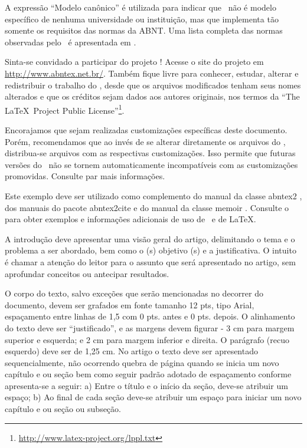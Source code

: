 \documentclass[
article,			%
11pt,				%
twoside,			%
a4paper,			%
section=TITLE,		%
onecolumn,          %
english,			%
brazil,				%
sumario=tradicional
]{abntex2}
\begin{document}
    A expressão ``Modelo canônico'' é utilizada para indicar que \abnTeX\ não é modelo específico de nenhuma universidade ou instituição, mas que implementa tão somente os requisitos das normas da ABNT. Uma lista completa das normas observadas pelo \abnTeX\ é apresentada em .
    
    Sinta-se convidado a participar do projeto \abnTeX! Acesse o site do projeto em \url{http://www.abntex.net.br/}. Também fique livre para conhecer, estudar, alterar e redistribuir o trabalho do \abnTeX, desde que os arquivos modificados tenham seus nomes alterados e que os créditos sejam dados aos autores originais, nos termos da ``The \LaTeX\ Project Public License''\footnote{\url{http://www.latex-project.org/lppl.txt}}.
    
    Encorajamos que sejam realizadas customizações específicas deste documento. Porém, recomendamos que ao invés de se alterar diretamente os arquivos do \abnTeX, distribua-se arquivos com as respectivas customizações. Isso permite que futuras versões do \abnTeX~não se tornem automaticamente incompatíveis com as customizações promovidas. Consulte  par mais informações.
    
    Este exemplo deve ser utilizado como complemento do manual da classe \textsf{abntex2} \cite{abntex2classe}, dos manuais do pacote \textsf{abntex2cite} \cite{abntex2cite,abntex2cite-alf} e do manual da classe \textsf{memoir} \cite{memoir}. Consulte o  para obter exemplos e informações adicionais de uso de \abnTeX\ e de \LaTeX.

A introdução deve apresentar uma visão geral do artigo, delimitando o tema e o problema a ser abordado, bem como o (s) objetivo (s) e a justificativa. O intuito é chamar a atenção do leitor para o assunto que será apresentado no artigo, sem aprofundar conceitos ou antecipar resultados. 

O corpo do texto, salvo exceções que serão mencionadas no decorrer do documento, devem ser grafados em fonte tamanho 12 pts, tipo Arial, espaçamento entre linhas de 1,5 com 0 pts. antes e 0 pts. depois. O alinhamento do texto deve ser “justificado”, e as margens devem figurar -  3 cm para margem superior e esquerda; e 2 cm para margem inferior e direita. O parágrafo (recuo esquerdo) deve ser de 1,25 cm. No artigo o texto deve ser apresentado sequencialmente, não ocorrendo quebra de página quando se inicia um novo capítulo e ou seção bem como seguir padrão adotado de espaçamento conforme apresenta-se a seguir: a) Entre o título e o início da seção, deve-se atribuir um espaço; b) Ao final de cada seção deve-se atribuir um espaço para iniciar um novo capítulo e ou seção ou subseção. 
\end{document}
